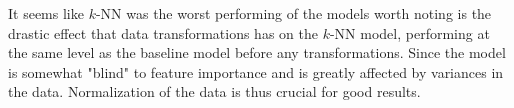 \documentclass[../../project.tex]{subfiles}
\begin{document}
	It seems like $k$-NN was the worst performing of the models worth noting is the drastic effect that data transformations has on the $k$-NN model, performing at the same level as the baseline model before any transformations. Since the model is somewhat "blind" to feature importance and is greatly affected by variances in the data. Normalization of the data is thus crucial for good results.
\end{document}
